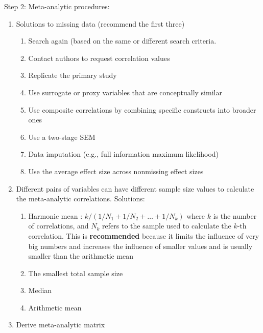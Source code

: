 \documentclass[
]{book}
\providecommand{\tightlist}{%
  \setlength{\itemsep}{0pt}\setlength{\parskip}{0pt}}
\begin{document}
Step 2: Meta-analytic procedures:

\begin{enumerate}
\def\labelenumi{\arabic{enumi}.}
\tightlist
\item
  Solutions to missing data (recommend the first three)

  \begin{enumerate}
  \def\labelenumii{\arabic{enumii}.}
  \item
    Search again (based on the same or different search criteria.
  \item
    Contact authors to request correlation values \citep{shadish1996}
  \item
    Replicate the primary study
  \item
    Use surrogate or proxy variables that are conceptually similar \citep{eby1999motivational}
  \item
    Use composite correlations by combining specific constructs into broader ones \citep{viswesvaran1995theory}
  \item
    Use a two-stage SEM \citep{cheung2005meta, fan2010factor}
  \item
    Data imputation (e.g., full information maximum likelihood) \citep{cheung2008model}
  \item
    Use the average effect size across nonmissing effect sizes \citep{viswesvaran1995theory}
  \end{enumerate}
\item
  Different pairs of variables can have different sample size values to calculate the meta-analytic correlations. Solutions:

  \begin{enumerate}
  \def\labelenumii{\arabic{enumii}.}
  \item
    Harmonic mean \citep{burke2003methodological}: \(k/(1/N_1 + 1/N_2 + \dots + 1/N_k)\) where \(k\) is the number of correlations, and \(N_k\) refers to the sample used to calculate the \(k\)-th correlation. This is \textbf{recommended} because it limits the influence of very big numbers and increases the influence of smaller values and is usually smaller than the arithmetic mean \citep{landis2013successfully, johnson2001synthetic}
  \item
    The smallest total sample size \citep{roesch2001meta}
  \item
    Median \citep{tokunaga2010evaluation}
  \item
    Arithmetic mean \citep{graham2011measuring, judge2002personality}
  \end{enumerate}
\item
  Derive meta-analytic matrix
\end{enumerate}
\end{document}
